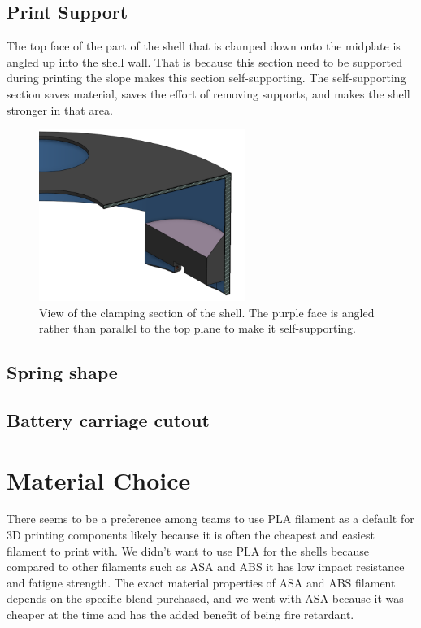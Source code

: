\documentclass{iopart}
\begin{document}
\subsection{Print Support}
The top face of the part of the shell that is clamped down onto the midplate is angled up into the shell wall. That is because this section need to be supported during printing the slope makes this section self-supporting. The self-supporting section saves material, saves the effort of removing supports, and makes the shell stronger in that area.

\begin{figure}[h!] 
        \centering       
        \includegraphics[width=0.6\textwidth]{graphics/shell_print_support.png}
        \caption{View of the clamping section of the shell. The purple face is angled rather than parallel to the top plane to make it self-supporting.}
\end{figure}

\subsection{Spring shape}
\subsection{Battery carriage cutout}

\section{Material Choice}
There seems to be a preference among teams to use PLA filament as a default for 3D printing components likely because it is often the cheapest and easiest filament to print with. We didn't want to use PLA for the shells because compared to other filaments such as ASA and ABS it has low impact resistance and fatigue strength. The exact material properties of ASA and ABS filament depends on the specific blend purchased, and we went with ASA because it was cheaper at the time and has the added benefit of being fire retardant.
\end{document}
